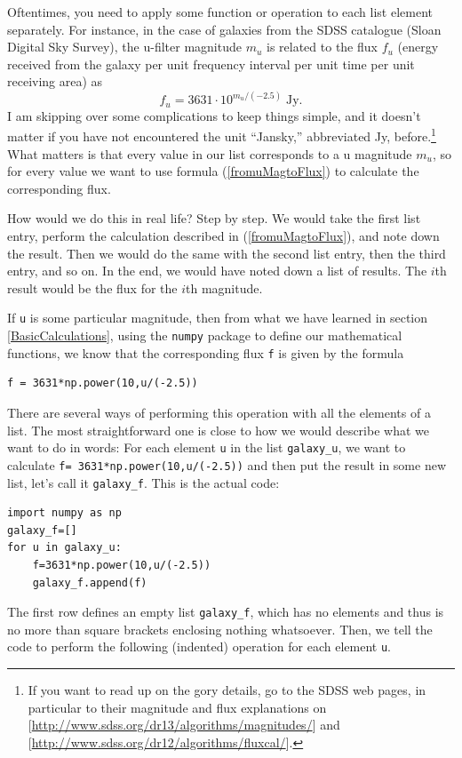 \documentclass[twocolumn,apj]{openjournal}
\newcommand{\be}{\begin{equation}}
\newcommand{\ee}{\end{equation}}
\begin{document}
Oftentimes, you need to apply some function or operation to each list element separately. For instance, in the case of galaxies from the SDSS catalogue (Sloan Digital Sky Survey), the u-filter magnitude $m_u$ is related to the flux $f_u$ (energy received from the galaxy per unit frequency interval per unit time per unit receiving area) as
\be
f_u =3631 \cdot 10^{m_u/(-2.5)} \;\mbox{Jy}.
\label{fromuMagtoFlux}
\ee
I am skipping over some complications to keep things simple, and it doesn't matter if you have not encountered the unit ``Jansky,'' abbreviated Jy, before.\footnote{If you want to read up on the gory details, go to the SDSS web pages, in particular to their magnitude and flux explanations on [\href{http://www.sdss.org/dr13/algorithms/magnitudes/}{http://www.sdss.org/dr13/algorithms/magnitudes/}] and [\href{http://www.sdss.org/dr12/algorithms/fluxcal/}{http://www.sdss.org/dr12/algorithms/fluxcal/}].} What matters is that every value in our list corresponds to a u magnitude $m_u$, so for every value we want to use formula (\ref{fromuMagtoFlux}) to calculate the corresponding flux.

How would we do this in real life? Step by step. We would take the first list entry, perform the calculation described in  (\ref{fromuMagtoFlux}), and note down the result. Then we would do the same with the second list entry, then the third entry, and so on. In the end, we would have noted down a list of results. The $i$th result would be the flux for the $i$th magnitude.

If \verb|u| is some particular magnitude, then from what we have learned in section \ref{BasicCalculations}, using the \verb|numpy| package to define our mathematical functions, we know that the corresponding flux \verb|f| is given by the formula
\begin{lstlisting}
f = 3631*np.power(10,u/(-2.5))
\end{lstlisting}

There are several ways of performing this operation with all the elements of a list. The most straightforward one is close to how we would describe what we want to do in words: For each element \verb|u| in the list \verb|galaxy_u|, we want to calculate
\verb|f= 3631*np.power(10,u/(-2.5))| and then put the result in some new list, let's call it \verb|galaxy_f|. This is the actual code:
\begin{lstlisting}
import numpy as np
galaxy_f=[]
for u in galaxy_u:
	f=3631*np.power(10,u/(-2.5))
	galaxy_f.append(f)
\end{lstlisting}
The first row defines an empty list \verb|galaxy_f|, which has no elements and thus is no more than square brackets enclosing nothing whatsoever. Then, we tell the code to perform the following (indented) operation for each element \verb|u|. 
\end{document}
